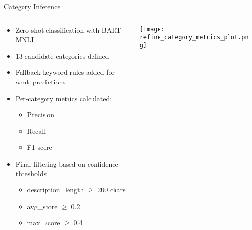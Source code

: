 \begin{frame}{Category Inference}

\begin{columns}
  \begin{column}{0.49\textwidth}
    \centering
    \begin{itemize}
      \item Zero-shot classification with BART-MNLI
      \item 13 candidate categories defined
      \item Fallback keyword rules added for weak predictions
      \item Per-category metrics calculated:
        \begin{itemize}
          \item Precision
          \item Recall
          \item F1-score
        \end{itemize}

      \item Final filtering based on confidence thresholds:
        \begin{itemize}
          \item description\_length $\geq$ 200 chars
          \item avg\_score $\geq$ 0.2
          \item max\_score $\geq$ 0.4
        \end{itemize}
  \end{itemize} 
  \end{column}

  \begin{column}{0.45\textwidth}
    \centering
    \texttt{[image: refine\_category\_metrics\_plot.png]}
  \end{column}
\end{columns}

\end{frame}

